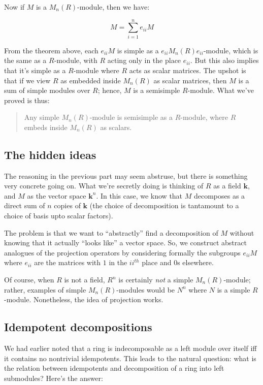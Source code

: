 \documentclass[a4paper]{amsart}
\newcommand{\field}{\mathbf{k}}
\begin{document}
Now if $M$ is a $M_n(R)$-module, then we have:

$$M = \sum_{i=1}^n e_{ii}M$$

From the theorem above, each $e_{ii}M$ is simple as a
$e_{ii}M_n(R)e_{ii}$-module, which is the same as a $R$-module, with
$R$ acting only in the place $e_{ii}$. But this also implies that it's
simple as a $R$-module where $R$ acts as scalar matrices. The upshot
is that if we view $R$ as embedded inside $M_n(R)$ as scalar matrices,
then $M$ is a sum of simple modules over $R$; hence, $M$ is a
semisimple $R$-module. What we've proved is thus:

\begin{quote}
  Any simple $M_n(R)$-module is semisimple as a $R$-module, where $R$
  embeds inside $M_n(R)$ as scalars.
\end{quote}

\subsection{The hidden ideas}

The reasoning in the previous part may seem abstruse, but there is
something very concrete going on. What we're secretly doing is
thinking of $R$ as a field $\field$, and $M$ as the vector space
$\field^n$. In this case, we know that $M$ decomposes as a direct sum
of $n$ copies of $\field$ (the choice of decomposition is tantamount
to a choice of basis upto scalar factors).

The problem is that we want to ``abstractly'' find a decomposition of
$M$ without knowing that it actually ``looks like'' a vector
space. So, we construct abstract analogues of the projection operators
by considering formally the subgroups $e_{ii}M$ where $e_{ii}$ are the
matrices with $1$ in the $ii^{th}$ place and $0$s elsewhere.

Of course, when $R$ is not a field, $R^n$ is certainly {\em not} a
simple $M_n(R)$-module; rather, examples of simple $M_n(R)$-modules
would be $N^n$ where $N$ is a simple $R$-module. Nonetheless, the idea
of projection works.

\subsection{Idempotent decompositions}

We had earlier noted that a ring is indecomposable as a left module
over itself iff it contains no nontrivial idempotents. This leads to
the natural question: what is the relation between idempotents and
decomposition of a ring into left submodules? Here's the answer:
\end{document}
